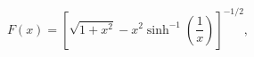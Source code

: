 \begin{equation}
F(x) = \left[ \sqrt{1+x^2} - x^2 \sinh^{-1}\left(\frac{1}{x}\right)
\right]^{-1/2},
\end{equation}

